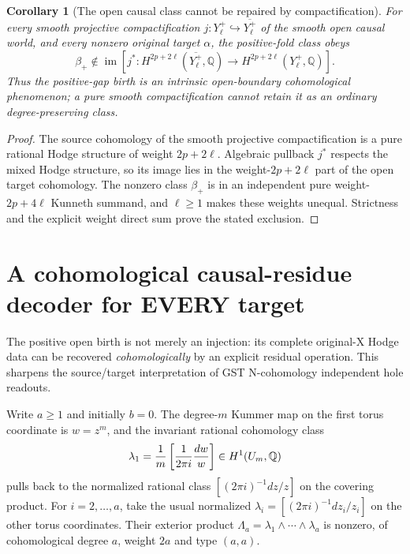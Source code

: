 \documentclass[11pt]{article}
\newtheorem{corollary}{Corollary}
\begin{document}
\begin{corollary}[The open causal class cannot be repaired by compactification]
For every smooth projective compactification
$j:Y^+_\ell\hookrightarrow\overline{Y^+_\ell}$
of the smooth open causal world, and every nonzero
original target $\alpha$, the positive-fold class obeys
\[
 \boxed{\quad
 \beta_+\notin
 \operatorname{im}\!\left[
   j^*:H^{2p+2\ell}(\overline{Y^+_\ell},\mathbb Q)
   \longrightarrow H^{2p+2\ell}(Y^+_\ell,\mathbb Q)
 \right].\quad}                                        \tag{18a}
\]
Thus the positive-gap birth is an intrinsic open-boundary
cohomological phenomenon; a pure smooth compactification
cannot retain it as an ordinary degree-preserving class.
\end{corollary}
\begin{proof}
The source cohomology of the smooth projective compactification
is a pure rational Hodge structure of weight $2p+2\ell$.
Algebraic pullback $j^*$ respects the mixed Hodge structure,
so its image lies in the weight-$2p+2\ell$ part of the open
target cohomology. The nonzero class $\beta_+$ is in an
independent pure weight-$2p+4\ell$ Kunneth summand, and
$\ell\ge1$ makes these weights unequal. Strictness and the
explicit weight direct sum prove the stated exclusion.
\end{proof}

\section{A cohomological causal-residue decoder for EVERY target}
The positive open birth is not merely an injection: its complete
original-X Hodge data can be recovered \emph{cohomologically} by an
explicit residual operation. This sharpens the source/target
interpretation of GST N-cohomology independent hole readouts.

Write $a\ge1$ and initially $b=0$.
The degree-$m$ Kummer map on the first torus coordinate
is $w=z^m$, and the invariant rational cohomology class
\[
 \lambda_1={1\over m}\left[{1\over2\pi i}{dw\over w}\right]
 \in H^1(U_m,\mathbb Q)
\]
pulls back to the normalized rational class
$[(2\pi i)^{-1}dz/z]$ on the covering product.
For $i=2,\ldots,a$, take the usual normalized
$\lambda_i=[(2\pi i)^{-1}dz_i/z_i]$ on the other
torus coordinates. Their exterior product
$\Lambda_a=\lambda_1\wedge\cdots\wedge\lambda_a$
is nonzero, of cohomological degree $a$, weight $2a$
and type $(a,a)$.
\end{document}
